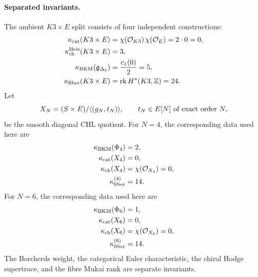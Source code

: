 \paragraph{Separated invariants.}
The ambient \(K3\times E\) split consists of four independent
constructions:
\[
\begin{aligned}
\kappa_{\mathrm{cat}}(K3\times E)
  &=\chi(\mathcal O_{K3})\,\chi(\mathcal O_E)=2\cdot0=0,\\
\kappa_{\mathrm{ch}}^{\mathrm{Heis}}(K3\times E)
  &=3,\\
\kappa_{\mathrm{BKM}}(\mathfrak g_{\Delta_5})
  &=\frac{c_1(0)}2=5,\\
\kappa_{\mathrm{fiber}}(K3\times E)
  &=\mathrm{rk}\,H^*(K3,\mathbb{Z})=24 .
\end{aligned}
\]
Let
\[
X_N=(S\times E)/\langle(g_N,t_N)\rangle,\qquad
t_N\in E[N]\ \hbox{of exact order}\ N,
\]
be the smooth diagonal CHL quotient. For \(N=4\), the corresponding
data used here are
\[
\begin{aligned}
\kappa_{\mathrm{BKM}}(\Phi_4)&=2,\\
\kappa_{\mathrm{cat}}(X_4)&=0,\\
\kappa_{\mathrm{ch}}(X_4)&=\chi(\mathcal O_{X_4})=0,\\
\kappa_{\mathrm{fiber}}^{(4)}&=14 .
\end{aligned}
\]
For \(N=6\), the corresponding data used here are
\[
\begin{aligned}
\kappa_{\mathrm{BKM}}(\Phi_6)&=1,\\
\kappa_{\mathrm{cat}}(X_6)&=0,\\
\kappa_{\mathrm{ch}}(X_6)&=\chi(\mathcal O_{X_6})=0,\\
\kappa_{\mathrm{fiber}}^{(6)}&=14 .
\end{aligned}
\]
The Borcherds weight, the categorical Euler characteristic, the chiral
Hodge supertrace, and the fibre Mukai rank are separate invariants.
